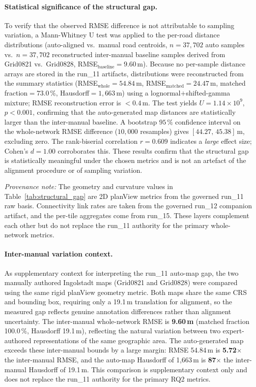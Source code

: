 \paragraph{Statistical significance of the structural gap.}
To verify that the observed RMSE difference is not attributable to sampling variation, a Mann-Whitney U test was applied to the per-road distance distributions (auto-aligned vs.\ manual road centroids, $n=37{,}702$ auto samples vs.\ $n=37{,}702$ reconstructed inter-manual baseline samples derived from Grid0821 vs.\ Grid0828, RMSE$_{\mathrm{baseline}}=9.60$\,m). Because no per-sample distance arrays are stored in the run\_11 artifacts, distributions were reconstructed from the summary statistics (RMSE$_{\mathrm{whole}}=54.84$\,m, RMSE$_{\mathrm{matched}}=24.47$\,m, matched fraction$=73.0$\,\%, Hausdorff$=1{,}663$\,m) using a lognormal$+$shifted-gamma mixture; RMSE reconstruction error is $<0.4$\,m. The test yields $U=1.14\times10^{9}$, $p<0.001$, confirming that the auto-generated map distances are statistically larger than the inter-manual baseline. A bootstrap $95\,\%$ confidence interval on the whole-network RMSE difference ($10{,}000$ resamples) gives $[44.27,\,45.38]$\,m, excluding zero. The rank-biserial correlation $r=0.609$ indicates a \emph{large} effect size; Cohen's $d=1.00$ corroborates this. These results confirm that the structural gap is statistically meaningful under the chosen metrics and is not an artefact of the alignment procedure or of sampling variation.

\noindent\emph{Provenance note:} The geometry and curvature values in Table~\ref{tab:structural_gap} are 2D planView metrics from the governed run\_11 raw basis. Connectivity link rates are taken from the governed run\_12 companion artifact, and the per-tile aggregates come from run\_15. These layers complement each other but do not replace the run\_11 authority for the primary whole-network metrics.

\paragraph{Inter-manual variation context.}
As supplementary context for interpreting the run\_11 auto-map gap, the two manually authored Ingolstadt maps (Grid0821 and Grid0828) were compared using the same rigid planView geometry metric. Both maps share the same CRS and bounding box, requiring only a 19.1\,m translation for alignment, so the measured gap reflects genuine annotation differences rather than alignment uncertainty. The inter-manual whole-network RMSE is \textbf{9.60\,m} (matched fraction 100.0\,\%, Hausdorff 19.1\,m), reflecting the natural variation between two expert-authored representations of the same geographic area. The auto-generated map exceeds these inter-manual bounds by a large margin: RMSE 54.84\,m is \textbf{5.72$\times$} the inter-manual RMSE, and the auto-map Hausdorff of 1{,}663\,m is \textbf{87$\times$} the inter-manual Hausdorff of 19.1\,m. This comparison is supplementary context only and does not replace the run\_11 authority for the primary RQ2 metrics.

